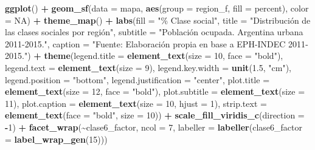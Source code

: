 \documentclass[
]{article}
\newenvironment{Shaded}{\begin{snugshade}}{\end{snugshade}}
\newcommand{\AttributeTok}[1]{\textcolor[rgb]{0.13,0.29,0.53}{#1}}
\newcommand{\ConstantTok}[1]{\textcolor[rgb]{0.56,0.35,0.01}{#1}}
\newcommand{\DecValTok}[1]{\textcolor[rgb]{0.00,0.00,0.81}{#1}}
\newcommand{\FloatTok}[1]{\textcolor[rgb]{0.00,0.00,0.81}{#1}}
\newcommand{\FunctionTok}[1]{\textcolor[rgb]{0.13,0.29,0.53}{\textbf{#1}}}
\newcommand{\NormalTok}[1]{#1}
\newcommand{\SpecialCharTok}[1]{\textcolor[rgb]{0.81,0.36,0.00}{\textbf{#1}}}
\newcommand{\StringTok}[1]{\textcolor[rgb]{0.31,0.60,0.02}{#1}}
\begin{document}
\begin{Shaded}
\begin{Highlighting}[]
\FunctionTok{ggplot}\NormalTok{() }\SpecialCharTok{+}
  \FunctionTok{geom\_sf}\NormalTok{(}\AttributeTok{data =}\NormalTok{ mapa, }\FunctionTok{aes}\NormalTok{(}\AttributeTok{group =}\NormalTok{ region\_f, }\AttributeTok{fill =}\NormalTok{ percent), }\AttributeTok{color =} \ConstantTok{NA}\NormalTok{) }\SpecialCharTok{+}
  \FunctionTok{theme\_map}\NormalTok{() }\SpecialCharTok{+}
  \FunctionTok{labs}\NormalTok{(}\AttributeTok{fill =} \StringTok{"\% Clase social"}\NormalTok{,}
       \AttributeTok{title =} \StringTok{"Distribución de las clases sociales por región"}\NormalTok{,}
       \AttributeTok{subtitle =} \StringTok{"Población ocupada. Argentina urbana 2011{-}2015."}\NormalTok{,}
       \AttributeTok{caption =} \StringTok{"Fuente: Elaboración propia en base a EPH{-}INDEC 2011{-}2015."}\NormalTok{) }\SpecialCharTok{+}
  \FunctionTok{theme}\NormalTok{(}\AttributeTok{legend.title =} \FunctionTok{element\_text}\NormalTok{(}\AttributeTok{size =} \DecValTok{10}\NormalTok{, }\AttributeTok{face =} \StringTok{"bold"}\NormalTok{),}
        \AttributeTok{legend.text =} \FunctionTok{element\_text}\NormalTok{(}\AttributeTok{size =} \DecValTok{9}\NormalTok{),}
        \AttributeTok{legend.key.width =} \FunctionTok{unit}\NormalTok{(}\FloatTok{1.5}\NormalTok{, }\StringTok{"cm"}\NormalTok{),}
        \AttributeTok{legend.position =} \StringTok{"bottom"}\NormalTok{,}
        \AttributeTok{legend.justification =} \StringTok{"center"}\NormalTok{,}
        \AttributeTok{plot.title =} \FunctionTok{element\_text}\NormalTok{(}\AttributeTok{size =} \DecValTok{12}\NormalTok{, }\AttributeTok{face =} \StringTok{"bold"}\NormalTok{),}
        \AttributeTok{plot.subtitle =} \FunctionTok{element\_text}\NormalTok{(}\AttributeTok{size =} \DecValTok{11}\NormalTok{),}
        \AttributeTok{plot.caption =} \FunctionTok{element\_text}\NormalTok{(}\AttributeTok{size =} \DecValTok{10}\NormalTok{, }\AttributeTok{hjust =} \DecValTok{1}\NormalTok{),}
        \AttributeTok{strip.text =} \FunctionTok{element\_text}\NormalTok{(}\AttributeTok{face =} \StringTok{"bold"}\NormalTok{, }\AttributeTok{size =} \DecValTok{10}\NormalTok{)) }\SpecialCharTok{+}
  \FunctionTok{scale\_fill\_viridis\_c}\NormalTok{(}\AttributeTok{direction =} \SpecialCharTok{{-}}\DecValTok{1}\NormalTok{) }\SpecialCharTok{+}
  \FunctionTok{facet\_wrap}\NormalTok{(}\SpecialCharTok{\textasciitilde{}}\NormalTok{clase6\_factor, }\AttributeTok{ncol =} \DecValTok{7}\NormalTok{, }\AttributeTok{labeller =} \FunctionTok{labeller}\NormalTok{(}\AttributeTok{clase6\_factor =} \FunctionTok{label\_wrap\_gen}\NormalTok{(}\DecValTok{15}\NormalTok{)))}
\end{Highlighting}
\end{Shaded}
\end{document}
